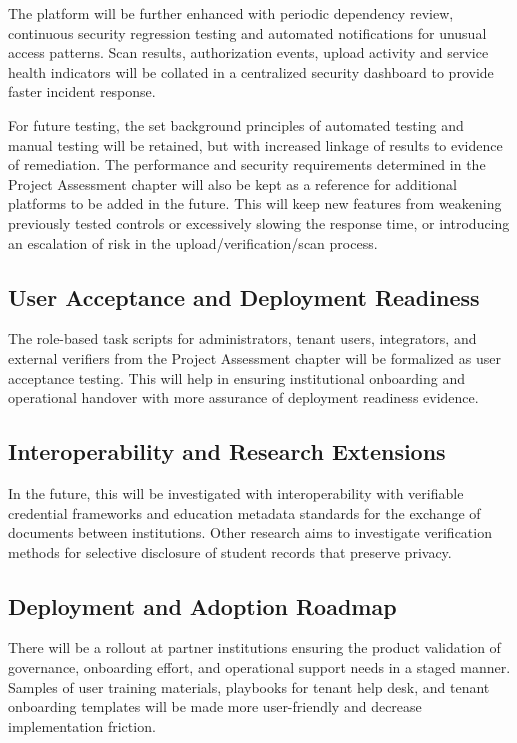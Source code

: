 The platform will be further enhanced with periodic dependency review, continuous security regression testing and automated notifications for unusual access patterns. Scan results, authorization events, upload activity and service health indicators will be collated in a centralized security dashboard to provide faster incident response.

For future testing, the set background principles of automated testing and manual testing will be retained, but with increased linkage of results to evidence of remediation. The performance and security requirements determined in the Project Assessment chapter will also be kept as a reference for additional platforms to be added in the future. This will keep new features from weakening previously tested controls or excessively slowing the response time, or introducing an escalation of risk in the upload/verification/scan process.

\subsection{User Acceptance and Deployment Readiness}

The role-based task scripts for administrators, tenant users, integrators, and external verifiers from the Project Assessment chapter will be formalized as user acceptance testing. This will help in ensuring institutional onboarding and operational handover with more assurance of deployment readiness evidence.

\subsection{Interoperability and Research Extensions}

In the future, this will be investigated with interoperability with verifiable credential frameworks and education metadata standards for the exchange of documents between institutions. Other research aims to investigate verification methods for selective disclosure of student records that preserve privacy.

\subsection{Deployment and Adoption Roadmap}

There will be a rollout at partner institutions ensuring the product validation of governance, onboarding effort, and operational support needs in a staged manner. Samples of user training materials, playbooks for tenant help desk, and tenant onboarding templates will be made more user-friendly and decrease implementation friction.

